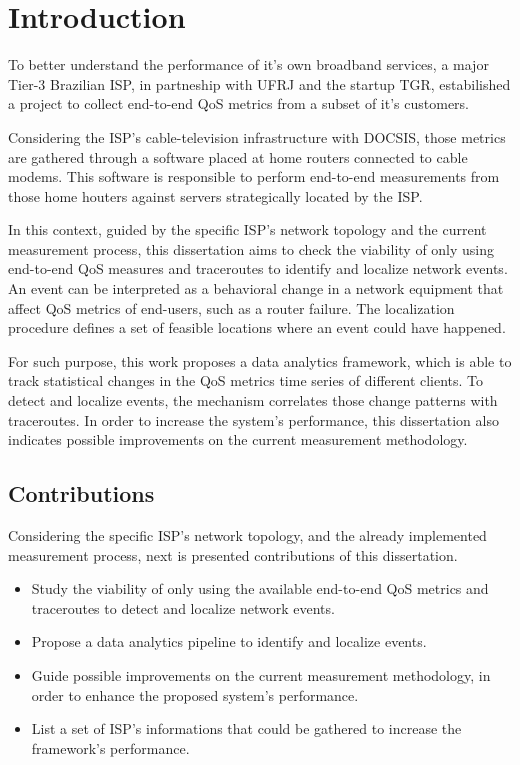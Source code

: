 \chapter{Introduction}

To better understand the performance of it's own broadband services, a major
Tier-3 Brazilian ISP, in partneship with UFRJ and the startup TGR,
estabilished a project to collect end-to-end QoS metrics from a subset
of it's customers.

Considering the ISP's cable-television infrastructure with DOCSIS,
those metrics are gathered through a software placed at home routers connected
to cable modems. This software is responsible to perform end-to-end
measurements from those home houters against servers strategically
located by the ISP.

In this context, guided by the specific ISP's network topology
and the current measurement process,
this dissertation aims to check the viability of
only using end-to-end QoS measures and traceroutes
to identify and localize network events. An event can be interpreted as a
behavioral change in a network equipment that affect QoS metrics of end-users,
such as a router failure. The localization procedure defines a set of
feasible locations where an event could have happened.

For such purpose, this work proposes a data analytics framework, which is able
to track statistical changes in the QoS metrics time series of different
clients.
To detect and localize events, the mechanism correlates those change
patterns with traceroutes.
In order to increase the system's performance,
this dissertation also indicates possible improvements on the current
measurement methodology.

\section{Contributions}

Considering the specific ISP's network topology, and the already implemented
measurement process, next is presented contributions of this dissertation.

\begin{itemize}
\item
Study the viability of only using the available end-to-end QoS metrics and
traceroutes to detect and localize network events.

\item Propose a data analytics pipeline to identify and localize events.

\item Guide possible improvements on the current measurement methodology,
in order to enhance the proposed system's performance.

\item List a set of ISP's informations that could be gathered to increase the
framework's performance.

\end{itemize}

